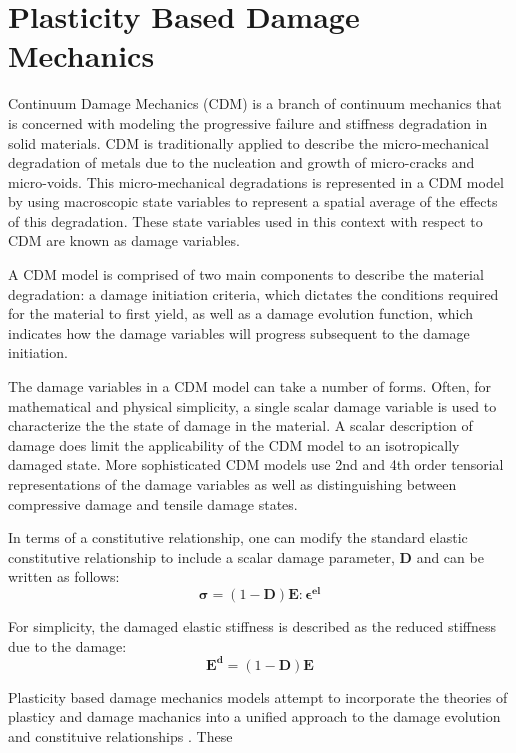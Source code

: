 \section{Plasticity Based Damage Mechanics}

Continuum Damage Mechanics (CDM) is a branch of continuum mechanics that is concerned with modeling the progressive failure and stiffness degradation in solid materials. CDM is traditionally applied to describe the micro-mechanical degradation of metals due to the nucleation and growth of micro-cracks and micro-voids. This micro-mechanical degradations is represented in a CDM model by using macroscopic state variables to represent a spatial average of the effects of this degradation. These state variables used in this context with respect to CDM are known as damage variables. 

A CDM model is comprised of two main components to describe the material degradation: a damage initiation criteria, which dictates the conditions required for the material to first yield, as well as a damage evolution function, which indicates how the damage variables will progress subsequent to the damage initiation. 

The damage variables in a CDM model can take a number of forms. Often, for mathematical and physical simplicity, a single scalar damage variable is used to characterize the the state of damage in the material. A scalar description of damage does limit the applicability of the CDM model to an isotropically damaged state. More sophisticated CDM models use 2nd and 4th order tensorial representations of the damage variables as well as distinguishing between compressive damage and tensile damage states. 

In terms of a constitutive relationship, one can modify the standard elastic constitutive relationship to include a scalar damage
parameter, $\mathbf{D}$ and can be written as follows: 
\begin{equation}
\boldsymbol{\sigma}=(1-\mathbf{D})\mathbf{E}:\boldsymbol{\epsilon^{el}}\label{eqn:const3}
\end{equation}


For simplicity, the damaged elastic stiffness is described as the
reduced stiffness due to the damage: 
\begin{equation}
\mathbf{E^{d}}=(1-\mathbf{D})\mathbf{E}\label{eqn:const4}
\end{equation}

Plasticity based damage mechanics models attempt to incorporate the
theories of plasticy and damage machanics into a unified approach
to the damage evolution and constituive relationships \cite{zhang_continuum_2010}. These 






